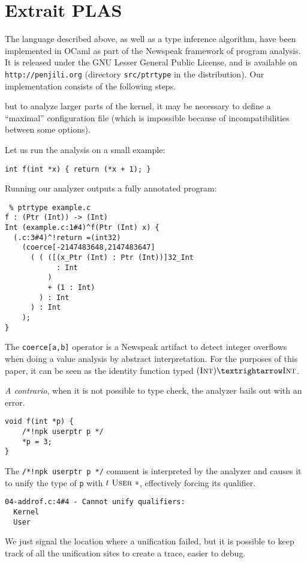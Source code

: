 \section*{Extrait PLAS}

The language described above, as well as a type inference algorithm, have been
implemented in OCaml as part of the Newspeak framework of program
analysis\cite{newspeak}. It is released under the GNU Lesser General Public
License, and is available on \texttt{http://penjili.org} (directory
\texttt{src/ptrtype} in the distribution). Our implementation consists of the
following steps.

but to analyze larger parts of the kernel, it may be
necessary to define a ``maximal'' configuration file (which is impossible
because of incompatibilities between some options).



Let us run the analysis on a small example:

\begin{verbatim}
int f(int *x) { return (*x + 1); }
\end{verbatim}

Running our analyzer outputs a fully annotated program:

\begin{verbatim}
 % ptrtype example.c
f : (Ptr (Int)) -> (Int)
Int (example.c:1#4)^f(Ptr (Int) x) {
  (.c:3#4)^!return =(int32)
    (coerce[-2147483648,2147483647]
      ( ( ([(x_Ptr (Int) : Ptr (Int))]32_Int
            : Int
          )
          + (1 : Int)
        ) : Int
      ) : Int
    );
}
\end{verbatim}

The \texttt{coerce[a,b]} operator is a Newspeak artifact to detect integer
overflows when doing a value analysis by abstract interpretation. For the
purposes of this paper, it can be seen as the identity function typed
$(\tInt) → \tInt$.

\emph{A contrario}, when it is not possible to type check, the analyzer bails
out with an error.

\begin{verbatim}
void f(int *p) {
    /*!npk userptr p */
    *p = 3;
}
\end{verbatim}

The \texttt{/*!npk userptr p */} comment is interpreted by the analyzer and
causes it to unify the type of \texttt{p} with $t~\textsc{User}~*$, effectively
forcing its qualifier.

\begin{verbatim}
04-addrof.c:4#4 - Cannot unify qualifiers:
  Kernel
  User
\end{verbatim}

We just signal the location where a unification failed, but it is possible to
keep track of all the unification sites to create a trace, easier to debug.



